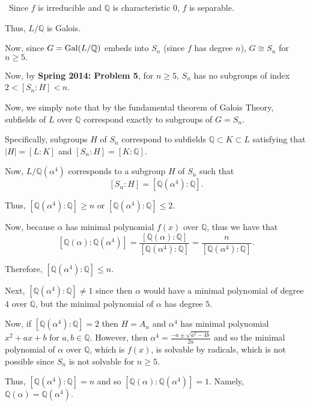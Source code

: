 \documentclass[12pt]{AlgebraQual}
\begin{document}
\begin{solution}$\,$
Since $f$ is irreducible and $\mathbb{Q}$ is characteristic $0$, $f$ is separable.

Thus, $L/\mathbb{Q}$ is Galois.

Now, since $G=\text{Gal}(L/\mathbb{Q})$ embeds into $S_n$ (since $f$ has degree $n$), $G\cong S_n$ for $n\ge 5.$

Now, by \textbf{Spring 2014: Problem 5}, for $n\ge 5$, $S_n$ has no subgroups of index $2<[S_n:H]<n$.

Now, we simply note that by the fundamental theorem of Galois Theory, subfields of $L$ over $\mathbb{Q}$ correspond exactly to subgroups of $G=S_n.$

Specifically, subgroups $H$ of $S_n$ correspond to subfields $\mathbb{Q}\subset K\subset L$ satisfying that $|H|=[L:K]$ and $[S_n:H]=[K:\mathbb{Q}].$

Now, $L/\mathbb{Q}(\alpha^4)$ corresponds to a subgroup $H$ of $S_n$ such that $$[S_n:H]=[\mathbb{Q}(\alpha^4):\mathbb{Q}].$$

Thus, $[\mathbb{Q}(\alpha^4):\mathbb{Q}]\ge n$ or $[\mathbb{Q}(\alpha^4):\mathbb{Q}]\le 2$.

Now, because $\alpha$ has minimal polynomial $f(x)$ over $\mathbb{Q}$, thus we have that $$[\mathbb{Q}(\alpha):\mathbb{Q}(\alpha^4)]=\frac{[\mathbb{Q}(\alpha):\mathbb{Q}]}{[\mathbb{Q}(\alpha^4):\mathbb{Q}]}=\frac{n}{[\mathbb{Q}(\alpha^4):\mathbb{Q}]}.$$

Therefore, $[\mathbb{Q}(\alpha^4):\mathbb{Q}]\le n$.

Next, $[\mathbb{Q}(\alpha^4):\mathbb{Q}]\not=1$ since then $\alpha$ would have a minimal polynomial of degree $4$ over $\mathbb{Q}$, but the minimal polynomial of $\alpha$ has degree $5.$

Now, if $[\mathbb{Q}(\alpha^4):\mathbb{Q}]=2$ then $H=A_n$ and $\alpha^4$ has minimal polynomial $x^2+ax+b$ for $a,b\in\mathbb{Q}$. However, then $\alpha^4=\frac{-a\pm\sqrt{a^2-4b}}{2a}$ and so the minimal polynomial of $\alpha$ over $\mathbb{Q}$, which is $f(x)$, is solvable by radicals, which is not possible since $S_n$ is not solvable for $n\ge 5.$

Thus, $[\mathbb{Q}(\alpha^4):\mathbb{Q}]=n$ and so $[\mathbb{Q}(\alpha):\mathbb{Q}(\alpha^4)]=1.$ Namely, $\mathbb{Q}(\alpha)=\mathbb{Q}(\alpha^4).$
\end{solution}
\end{document}
